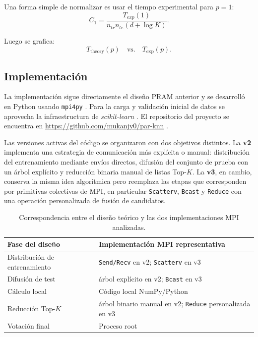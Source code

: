 \documentclass[11pt,a4paper]{article}
\begin{document}
Una forma simple de normalizar es usar el tiempo experimental para $p=1$:
\[
C_1
=
\frac{T_{exp}(1)}{n_{tr}n_{te}(d+\log K)}.
\]

Luego se grafica:
\[
T_{\text{theory}}(p)
\quad \text{vs.} \quad
T_{\text{exp}}(p).
\]



\subsection{Implementación}

La implementación sigue directamente el diseño PRAM anterior y se desarrolló en Python usando
\texttt{mpi4py} \cite{mpi4py}. Para la carga y validación inicial de datos se aprovecha la
infraestructura de \textit{scikit-learn} \cite{sklearn}. El repositorio del proyecto se encuentra en
\href{https://github.com/mukanjy0/par-knn}{https://github.com/mukanjy0/par-knn} \cite{repo}.

Las versiones activas del código se organizaron con dos objetivos distintos. La \textbf{v2}
implementa una estrategia de comunicación más explícita o manual: distribución del entrenamiento
mediante envíos directos, difusión del conjunto de prueba con un árbol explícito y reducción
binaria manual de listas Top-$K$. La \textbf{v3}, en cambio, conserva la misma idea algorítmica
pero reemplaza las etapas que corresponden por primitivas colectivas de MPI, en particular
\texttt{Scatterv}, \texttt{Bcast} y \texttt{Reduce} con una operación personalizada de fusión
de candidatos.

\begin{table}[H]
\centering
\begin{tabular}{ll}
\toprule
Fase del diseño & Implementación MPI representativa \\
\midrule
Distribución de entrenamiento & \texttt{Send/Recv} en v2; \texttt{Scatterv} en v3 \\
Difusión de test & árbol explícito en v2; \texttt{Bcast} en v3 \\
Cálculo local & Código local NumPy/Python \\
Reducción Top-$K$ & árbol binario manual en v2; \texttt{Reduce} personalizada en v3 \\
Votación final & Proceso root \\
\bottomrule
\end{tabular}
\caption{Correspondencia entre el diseño teórico y las dos implementaciones MPI analizadas.}
\end{table}
\end{document}
